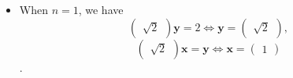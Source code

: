 \begin{itemize}
\renewcommand{\labelitemi}{\scriptsize$\blacksquare$}
    \item When $n=1$, we have 
    $$\begin{pmatrix}
        \sqrt{2}
    \end{pmatrix}
        \mathbf{y}
   = 2 \Leftrightarrow \mathbf{y}=\begin{pmatrix}
        \sqrt{2}
    \end{pmatrix},$$ 
    $$\begin{pmatrix}
        \sqrt{2}
    \end{pmatrix}\mathbf{x}=  \mathbf{y} \Leftrightarrow \mathbf{x} =\begin{pmatrix}
        1
    \end{pmatrix}$$.
\end{itemize}